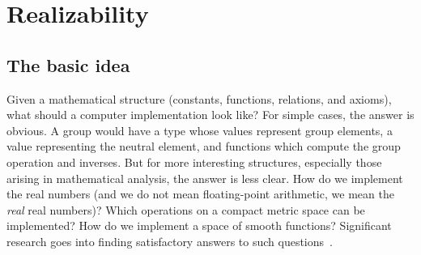\chapter{Realizability}
\label{chap:realizability}

\section{The basic idea}
\label{sec:realizability-basic-idea}

Given a mathematical structure (constants, functions, relations, and
axioms), what should a computer implementation look like? For simple
cases, the answer is obvious. A group would have a type whose values
represent group elements, a value representing the neutral element,
and functions which compute the group operation and inverses. But for
more interesting structures, especially those arising in mathematical
analysis, the answer is less clear. How do we implement the real
numbers (and we do not mean floating-point arithmetic, we mean the
\emph{real} real numbers)? Which operations on a compact metric space
can be implemented? How do we implement a space of smooth functions?
Significant research goes into finding satisfactory answers to such
questions~\cite{Wei00,TZ98,Bla97,edalat04:_domain_theor_differ_calcul_funct}.

